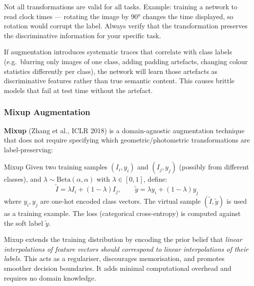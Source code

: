 \documentclass[11pt,a4paper]{article}
\newcommand{\term}[1]{\textcolor{DefGreen}{\textbf{#1}}}
\begin{document}
\begin{warnbox}
Not all transformations are valid for all tasks. Example: training a network to read clock times — rotating the image by 90° changes the time displayed, so rotation would corrupt the label. Always verify that the transformation preserves the discriminative information for your specific task.
\end{warnbox}

\begin{warnbox}
If augmentation introduces systematic traces that correlate with class labels (e.g.\ blurring only images of one class, adding padding artefacts, changing colour statistics differently per class), the network will learn those artefacts as discriminative features rather than true semantic content. This causes brittle models that fail at test time without the artefact.
\end{warnbox}

\subsubsection{Mixup Augmentation}

\term{Mixup} (Zhang et al., ICLR 2018) is a domain-agnostic augmentation technique that does not require specifying which geometric/photometric transformations are label-preserving:

\begin{defbox}{Mixup}
Given two training samples $(I_i, y_i)$ and $(I_j, y_j)$ (possibly from different classes), and $\lambda \sim \mathrm{Beta}(\alpha, \alpha)$ with $\lambda \in [0,1]$, define:
\[
\tilde{I} = \lambda I_i + (1-\lambda) I_j, \qquad \tilde{y} = \lambda y_i + (1-\lambda) y_j
\]
where $y_i, y_j$ are one-hot encoded class vectors. The virtual sample $(\tilde{I}, \tilde{y})$ is used as a training example. The loss (categorical cross-entropy) is computed against the soft label $\tilde{y}$.
\end{defbox}

\begin{insightbox}
Mixup extends the training distribution by encoding the prior belief that \emph{linear interpolations of feature vectors should correspond to linear interpolations of their labels}. This acts as a regulariser, discourages memorisation, and promotes smoother decision boundaries. It adds minimal computational overhead and requires no domain knowledge.
\end{insightbox}
\end{document}
